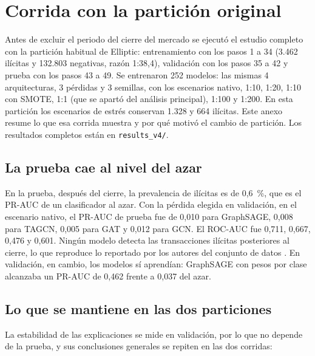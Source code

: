 \chapter{Corrida con la partición original}\label{anx:original}

Antes de excluir el periodo del cierre del mercado se ejecutó el estudio completo con la
partición habitual de Elliptic: entrenamiento con los pasos 1 a 34 (3.462 ilícitas y 132.803
negativas, razón 1:38,4), validación con los pasos 35 a 42 y prueba con los pasos 43 a 49. Se
entrenaron 252 modelos: las mismas 4 arquitecturas, 3 pérdidas y 3 semillas, con los escenarios
nativo, 1:10, 1:20, 1:10 con SMOTE, 1:1 (que se apartó del análisis principal), 1:100 y 1:200.
En esta partición los escenarios de estrés conservan 1.328 y 664 ilícitas. Este anexo resume
lo que esa corrida muestra y por qué motivó el cambio de partición. Los resultados completos
están en \texttt{results\_v4/}.

\section{La prueba cae al nivel del azar}

En la prueba, después del cierre, la prevalencia de ilícitas es de 0,6~\%, que es el PR-AUC
de un clasificador al azar. Con la pérdida elegida en validación, en el escenario nativo, el
PR-AUC de prueba fue de 0,010 para GraphSAGE, 0,008 para TAGCN, 0,005 para GAT y 0,012 para
GCN. El ROC-AUC fue 0,711, 0,667, 0,476 y 0,601. Ningún modelo detecta las transacciones
ilícitas posteriores al cierre, lo que reproduce lo reportado por los autores del conjunto de
datos \cite{Weber2019Elliptic}. En validación, en cambio, los modelos sí aprendían: GraphSAGE
con pesos por clase alcanzaba un PR-AUC de 0,462 frente a 0,037 del azar.

\section{Lo que se mantiene en las dos particiones}

La estabilidad de las explicaciones se mide en validación, por lo que no depende de la prueba,
y sus conclusiones generales se repiten en las dos corridas:


